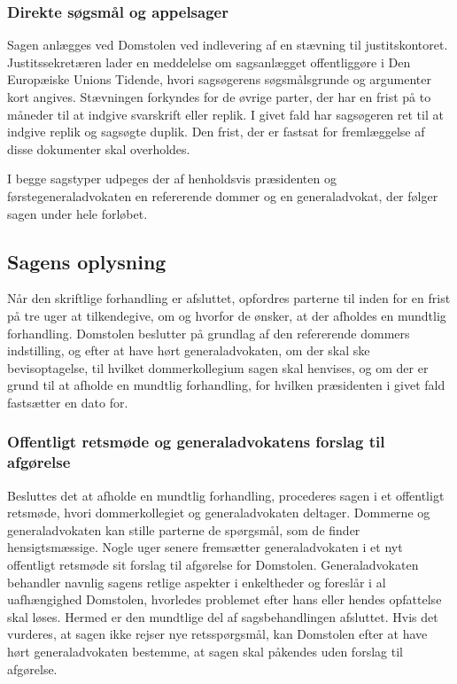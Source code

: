 \documentclass[]{book}
\begin{document}
\hypertarget{direkte-sgsmal-og-appelsager}{%
\subsubsection{Direkte søgsmål og appelsager}\label{direkte-sgsmal-og-appelsager}}

Sagen anlægges ved Domstolen ved indlevering af en stævning til justitskontoret. Justitssekretæren lader en meddelelse om sagsanlægget offentliggøre i Den Europæiske Unions Tidende, hvori sagsøgerens søgsmålsgrunde og argumenter kort angives. Stævningen forkyndes for de øvrige parter, der har en frist på to måneder til at indgive svarskrift eller replik. I givet fald har sagsøgeren ret til at indgive replik og sagsøgte duplik. Den frist, der er fastsat for fremlæggelse af disse dokumenter skal overholdes.

I begge sagstyper udpeges der af henholdsvis præsidenten og førstegeneraladvokaten en refererende dommer og en generaladvokat, der følger sagen under hele forløbet.

\hypertarget{sagens-oplysning}{%
\subsection{Sagens oplysning}\label{sagens-oplysning}}

Når den skriftlige forhandling er afsluttet, opfordres parterne til inden for en frist på tre uger at tilkendegive, om og hvorfor de ønsker, at der afholdes en mundtlig forhandling. Domstolen beslutter på grundlag af den refererende dommers indstilling, og efter at have hørt generaladvokaten, om der skal ske bevisoptagelse, til hvilket dommerkollegium sagen skal henvises, og om der er grund til at afholde en mundtlig forhandling, for hvilken præsidenten i givet fald fastsætter en dato for.

\hypertarget{offentligt-retsmde-og-generaladvokatens-forslag-til-afgrelse}{%
\subsubsection{Offentligt retsmøde og generaladvokatens forslag til afgørelse}\label{offentligt-retsmde-og-generaladvokatens-forslag-til-afgrelse}}

Besluttes det at afholde en mundtlig forhandling, procederes sagen i et offentligt retsmøde, hvori dommerkollegiet og generaladvokaten deltager. Dommerne og generaladvokaten kan stille parterne de spørgsmål, som de finder hensigtsmæssige. Nogle uger senere fremsætter generaladvokaten i et nyt offentligt retsmøde sit forslag til afgørelse for Domstolen. Generaladvokaten behandler navnlig sagens retlige aspekter i enkeltheder og foreslår i al uafhængighed Domstolen, hvorledes problemet efter hans eller hendes opfattelse skal løses. Hermed er den mundtlige del af sagsbehandlingen afsluttet. Hvis det vurderes, at sagen ikke rejser nye retsspørgsmål, kan Domstolen efter at have hørt generaladvokaten bestemme, at sagen skal påkendes uden forslag til afgørelse.
\end{document}
